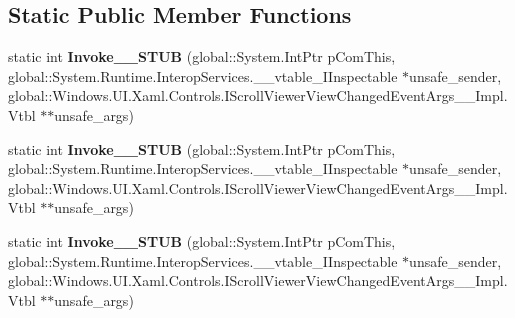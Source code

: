 \subsection*{Static Public Member Functions}
\begin{DoxyCompactItemize}
\item 
\mbox{\label{struct_system_1_1_event_handler___a___windows___u_i___xaml___controls___scroll_viewer_view_changd9b2e3e9495d0e3c92d7a0d6cea8508d_aa61ee73573349a0bcaf55745dee8e46e}} 
static int {\bfseries Invoke\+\_\+\+\_\+\+S\+T\+UB} (global\+::\+System.\+Int\+Ptr p\+Com\+This, global\+::\+System.\+Runtime.\+Interop\+Services.\+\_\+\+\_\+vtable\+\_\+\+I\+Inspectable $\ast$unsafe\+\_\+sender, global\+::\+Windows.\+U\+I.\+Xaml.\+Controls.\+I\+Scroll\+Viewer\+View\+Changed\+Event\+Args\+\_\+\+\_\+\+Impl.\+Vtbl $\ast$$\ast$unsafe\+\_\+args)
\item 
\mbox{\label{struct_system_1_1_event_handler___a___windows___u_i___xaml___controls___scroll_viewer_view_changd9b2e3e9495d0e3c92d7a0d6cea8508d_aa61ee73573349a0bcaf55745dee8e46e}} 
static int {\bfseries Invoke\+\_\+\+\_\+\+S\+T\+UB} (global\+::\+System.\+Int\+Ptr p\+Com\+This, global\+::\+System.\+Runtime.\+Interop\+Services.\+\_\+\+\_\+vtable\+\_\+\+I\+Inspectable $\ast$unsafe\+\_\+sender, global\+::\+Windows.\+U\+I.\+Xaml.\+Controls.\+I\+Scroll\+Viewer\+View\+Changed\+Event\+Args\+\_\+\+\_\+\+Impl.\+Vtbl $\ast$$\ast$unsafe\+\_\+args)
\item 
\mbox{\label{struct_system_1_1_event_handler___a___windows___u_i___xaml___controls___scroll_viewer_view_changd9b2e3e9495d0e3c92d7a0d6cea8508d_aa61ee73573349a0bcaf55745dee8e46e}} 
static int {\bfseries Invoke\+\_\+\+\_\+\+S\+T\+UB} (global\+::\+System.\+Int\+Ptr p\+Com\+This, global\+::\+System.\+Runtime.\+Interop\+Services.\+\_\+\+\_\+vtable\+\_\+\+I\+Inspectable $\ast$unsafe\+\_\+sender, global\+::\+Windows.\+U\+I.\+Xaml.\+Controls.\+I\+Scroll\+Viewer\+View\+Changed\+Event\+Args\+\_\+\+\_\+\+Impl.\+Vtbl $\ast$$\ast$unsafe\+\_\+args)
\item 
$$
\end{DoxyCompactItemize}

